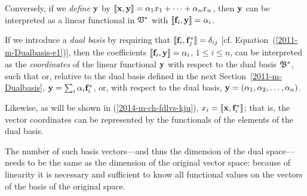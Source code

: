 Conversely, if we {\em define} ${\bf y}$ by $\llbracket {\bf x},{\bf y}\rrbracket  =\alpha_1  x_1+ \cdots +\alpha_n x_n$, then ${\bf y}$
can be interpreted as a linear functional in ${\frak V}^\ast$ with $\llbracket {\bf f}_i,{\bf y}\rrbracket  = \alpha_i$.

If we introduce a {\em dual basis}
by requiring that $\llbracket {\bf f}_i,  {\bf f}_j^\ast \rrbracket =\delta_{ij}$ [cf. Equation~(\ref{2011-m-Dualbasis-e1})],
then the coefficients $\llbracket {\bf f}_i ,{\bf y}\rrbracket  = \alpha_i$,
$1\le i \le n$, can be interpreted
as the {\em coordinates} of the linear functional ${\bf y}$ with respect to the dual
basis ${\frak B}^\ast$, such that or,
relative to the dual basis defined in the next Section~\ref{2011-m-Dualbasis},
${\bf y}=\sum_i \alpha_i {\bf f}_i^\ast$, or, with respect to the dual basis,
${\bf y}=(\alpha_1,\alpha_2,\ldots , \alpha_n)$.

Likewise, as will be shown in (\ref{2014-m-ch-fdlvs-kju}),
$
x_i =
 \llbracket {\bf x},{\bf f}_i^\ast \rrbracket
$; that is, the vector coordinates can be represented by the functionals of the elements of the dual basis.

The number of such basis vectors---and thus the dimension of the dual space---needs to be the same
as the dimension of the original vector space: because of linearity it is necessary and sufficient to know all functional values on the
vectors of the basis of the original space.


